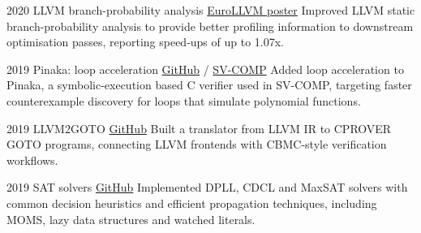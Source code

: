 \documentclass[a4paper]{cv-style}
\begin{document}
\begin{entrylist}
\entry
  {2020}
  {LLVM branch-probability analysis}
  {\href{https://llvm.org/devmtg/2020-04/talks.html\#Poster_89}{EuroLLVM poster}}
  {Improved LLVM static branch-probability analysis to provide better profiling information to downstream optimisation passes, reporting speed-ups of up to 1.07x.}

\entry
  {2019}
  {Pinaka: loop acceleration}
  {\href{https://github.com/TIFitis/loop_acceleration}{GitHub} / \href{https://sv-comp.sosy-lab.org/2020/results/results-verified/}{SV-COMP}}
  {Added loop acceleration to Pinaka, a symbolic-execution based C verifier used in SV-COMP, targeting faster counterexample discovery for loops that simulate polynomial functions.}

\entry
  {2019}
  {LLVM2GOTO}
  {\href{https://github.com/TIFitis/llvm2goto}{GitHub}}
  {Built a translator from LLVM IR to CPROVER GOTO programs, connecting LLVM frontends with CBMC-style verification workflows.}

\entry
  {2019}
  {SAT solvers}
  {\href{https://github.com/TIFitis/constraint-programming}{GitHub}}
  {Implemented DPLL, CDCL and MaxSAT solvers with common decision heuristics and efficient propagation techniques, including MOMS, lazy data structures and watched literals.}
\end{entrylist}
\end{document}
